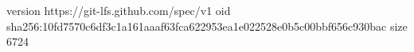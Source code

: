 version https://git-lfs.github.com/spec/v1
oid sha256:10fd7570c6df3c1a161aaaf63fca622953ea1e022528e0b5c00bbf656c930bac
size 6724
